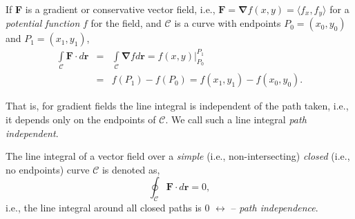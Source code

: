 \begin{theorem}
   If {\bf F} is a gradient or conservative vector field, i.e., $\mathbf{F}=\mathbf{\nabla}f(x,y)=\langle f_{x}, f_{y}\rangle$ for a {\it potential function} $f$ for the field, and $\mathcal{C}$ is a curve with endpoints $P_{0}=\left(x_{0},y_{0}\right)$ and $P_{1}=\left(x_{1},y_{1}\right)$,
      \begin{eqnarray}
         \int\limits_{\mathcal{C}}\mathbf{F}\cdot d\mathbf{r} &=& \int\limits_{\mathcal{C}}\mathbf{\nabla}f d \mathbf{r} = \left.f(x,y)\right|_{P_{0}}^{P_{1}}\\
                                                           &=& f\left(P_{1}\right)-f\left(P_{0}\right) = f\left(x_{1},y_{1}\right) - f\left(x_{0},y_{0}\right)\nonumber.
      \end{eqnarray}
\end{theorem} 
That is, for gradient fields the line integral is independent of the path taken, i.e., it depends only on the endpoints of $\mathcal{C}$. We call such a line integral {\it path independent}.
\medskip

The line integral of a vector field over a {\it simple} (i.e., non-intersecting) {\it closed} (i.e., no endpoints) curve $\mathcal{C}$ is denoted as,
        \begin{equation}
           \oint_{\mathcal{C}}\mathbf{F}\cdot d \mathbf{r} = 0,
        \end{equation}
i.e., the line integral around all closed paths is 0 $\leftrightarrow$ -- {\it path independence}.
